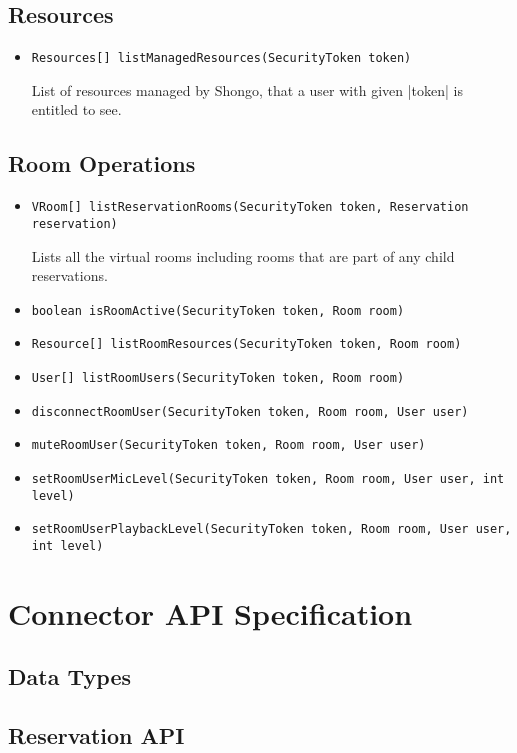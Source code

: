 \documentclass[a4paper]{report}
\newcommand{\APIcmd}[1]{\item \lstinline[style=myinline]!#1!}
\newenvironment{APIdef}{\begin{itemize}}{\end{itemize}}
\begin{document}
\section{Resources}

\begin{APIdef}

\APIcmd{Resources[] listManagedResources(SecurityToken token)}

List of resources managed by Shongo, that a user with given |token| is entitled to see.

\end{APIdef}


\section{Room Operations}

\begin{APIdef}

\APIcmd{VRoom[] listReservationRooms(SecurityToken token, Reservation reservation)}

Lists all the virtual rooms including rooms that are part of any child reservations.

\APIcmd{boolean isRoomActive(SecurityToken token, Room room)}

\APIcmd{Resource[] listRoomResources(SecurityToken token, Room room)}

\APIcmd{User[] listRoomUsers(SecurityToken token, Room room)}

\APIcmd{disconnectRoomUser(SecurityToken token, Room room, User user)}

\APIcmd{muteRoomUser(SecurityToken token, Room room, User user)}

\APIcmd{setRoomUserMicLevel(SecurityToken token, Room room, User user, int level)}

\APIcmd{setRoomUserPlaybackLevel(SecurityToken token, Room room, User user, int level)}

\end{APIdef}


\chapter{Connector API Specification}

\section{Data Types}

\section{Reservation API}
\end{document}
